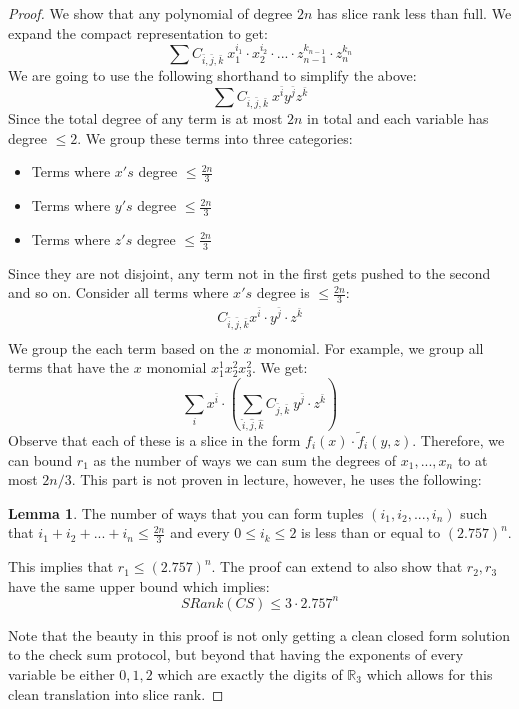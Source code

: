 \documentclass[11pt]{article}
\theoremstyle{definition}
\newtheorem{lemma}[theorem]{Lemma}
\begin{document}
\begin{proof}
    We show that any polynomial of degree $2n$ has slice rank less than full. We expand the compact representation to get:
    $$\sum C_{\bar{i},\bar{j},\bar{k}}\ x_1^{i_1} \cdot x_2 ^{i_2} \cdot ... \cdot z_{n-1}^{k_{n-1}} \cdot z_{n}^{k_{n}}$$
    We are going to use the following shorthand to simplify the above:
    $$\sum C_{\bar{i},\bar{j},\bar{k}}\ x^{\bar{i}} y^{\bar{j}} z^{\bar{k}}$$
    Since the total degree of any term is at most $2n$ in total and each variable has degree $\leq 2$. We group these terms into three categories:
    \begin{itemize}
        \item Terms where $x's$ degree $\leq \frac{2n}{3}$
        \item Terms where $y's$ degree $\leq \frac{2n}{3}$
        \item Terms where $z's$ degree $\leq \frac{2n}{3}$
    \end{itemize}
    Since they are not disjoint, any term not in the first gets pushed to the second and so on. Consider all terms where $x's$ degree is $\leq \frac{2n}{3}$:
    \begin{align*}
    C_{\bar{i},\bar{j},\bar{k}} x^{\bar{i}}\cdot y^{\bar{j}} \cdot z^{\bar{k}}\\
    \end{align*}
    We group the each term based on the $x$ monomial. For example, we group all terms that have the $x$ monomial $x_1^1x_2^2x_3^2$. We get:
    $$\sum_i x^{\bar{i}}\cdot (\sum_{\hat{i}, \hat{j},\hat{k}}C_{\bar{j},\bar{k}}\ y^{\bar{j}}\cdot z^{\bar{k}})$$
    Observe that each of these is a slice in the form $f_i(x) \cdot \widetilde{f}_i(y,z)$. Therefore, we can bound $r_1$ as the number of ways we can sum the degrees of $x_1,...,x_n$ to at most $2n/3$. This part is not proven in lecture, however, he uses the following:
    \begin{lemma}
    The number of ways that you can form tuples $(i_1,i_2,...,i_n)$ such that $i_1 + i_2 + ... + i_n \leq \frac{2n}{3}$ and every $0 \leq i_k \leq 2$ is less than or equal to $(2.757)^n$. 
    \end{lemma}
    This implies that $r_1 \leq (2.757)^n$. The proof can extend to also show that $r_2,r_3$ have the same upper bound which implies:
    $$SRank(CS) \leq 3 \cdot 2.757^n$$

    Note that the beauty in this proof is not only getting a clean closed form solution to the check sum protocol, but beyond that having the exponents of every variable be either $0,1,2$ which are exactly the digits of $\mathbb{R}_3$ which allows for this clean translation into slice rank. 
\end{proof}
 
\end{document}
